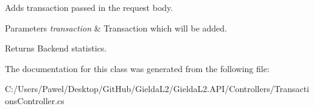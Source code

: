 Adds transaction passed in the request body. 


\begin{DoxyParams}{Parameters}
{\em transaction} & Transaction which will be added.\\
\hline
\end{DoxyParams}
\begin{DoxyReturn}{Returns}
Backend statistics.
\end{DoxyReturn}


The documentation for this class was generated from the following file\+:\begin{DoxyCompactItemize}
\item 
C\+:/\+Users/\+Pawel/\+Desktop/\+Git\+Hub/\+Gielda\+L2/\+Gielda\+L2.\+A\+P\+I/\+Controllers/Transactions\+Controller.\+cs\end{DoxyCompactItemize}
